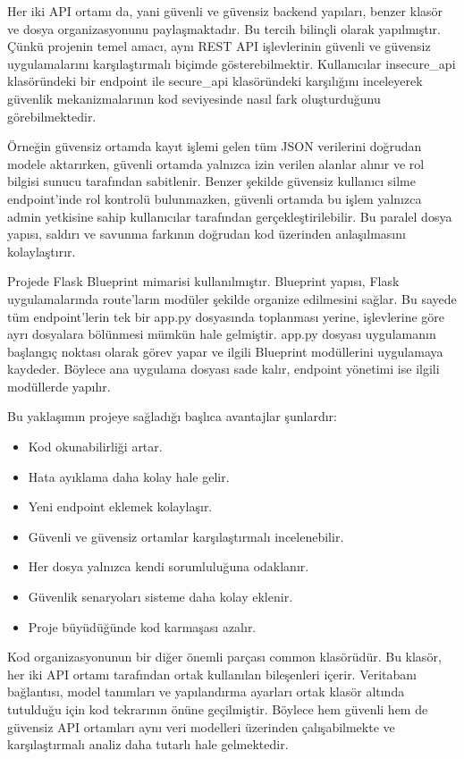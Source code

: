 Her iki API ortamı da, yani güvenli ve güvensiz backend yapıları, benzer klasör ve dosya organizasyonunu paylaşmaktadır. Bu tercih bilinçli olarak yapılmıştır. Çünkü projenin temel amacı, aynı REST API işlevlerinin güvenli ve güvensiz uygulamalarını karşılaştırmalı biçimde gösterebilmektir. Kullanıcılar insecure\_api klasöründeki bir endpoint ile secure\_api klasöründeki karşılığını inceleyerek güvenlik mekanizmalarının kod seviyesinde nasıl fark oluşturduğunu görebilmektedir.

Örneğin güvensiz ortamda kayıt işlemi gelen tüm JSON verilerini doğrudan modele aktarırken, güvenli ortamda yalnızca izin verilen alanlar alınır ve rol bilgisi sunucu tarafından sabitlenir. Benzer şekilde güvensiz kullanıcı silme endpoint’inde rol kontrolü bulunmazken, güvenli ortamda bu işlem yalnızca admin yetkisine sahip kullanıcılar tarafından gerçekleştirilebilir. Bu paralel dosya yapısı, saldırı ve savunma farkının doğrudan kod üzerinden anlaşılmasını kolaylaştırır.

Projede Flask Blueprint mimarisi kullanılmıştır. Blueprint yapısı, Flask uygulamalarında route’ların modüler şekilde organize edilmesini sağlar. Bu sayede tüm endpoint’lerin tek bir app.py dosyasında toplanması yerine, işlevlerine göre ayrı dosyalara bölünmesi mümkün hale gelmiştir. app.py dosyası uygulamanın başlangıç noktası olarak görev yapar ve ilgili Blueprint modüllerini uygulamaya kaydeder. Böylece ana uygulama dosyası sade kalır, endpoint yönetimi ise ilgili modüllerde yapılır.

Bu yaklaşımın projeye sağladığı başlıca avantajlar şunlardır:

\begin{itemize}[leftmargin=*]
    \item Kod okunabilirliği artar.
    \item Hata ayıklama daha kolay hale gelir.
    \item Yeni endpoint eklemek kolaylaşır.
    \item Güvenli ve güvensiz ortamlar karşılaştırmalı incelenebilir.
    \item Her dosya yalnızca kendi sorumluluğuna odaklanır.
    \item Güvenlik senaryoları sisteme daha kolay eklenir.
    \item Proje büyüdüğünde kod karmaşası azalır.
\end{itemize}

Kod organizasyonunun bir diğer önemli parçası common klasörüdür. Bu klasör, her iki API ortamı tarafından ortak kullanılan bileşenleri içerir. Veritabanı bağlantısı, model tanımları ve yapılandırma ayarları ortak klasör altında tutulduğu için kod tekrarının önüne geçilmiştir. Böylece hem güvenli hem de güvensiz API ortamları aynı veri modelleri üzerinden çalışabilmekte ve karşılaştırmalı analiz daha tutarlı hale gelmektedir.

